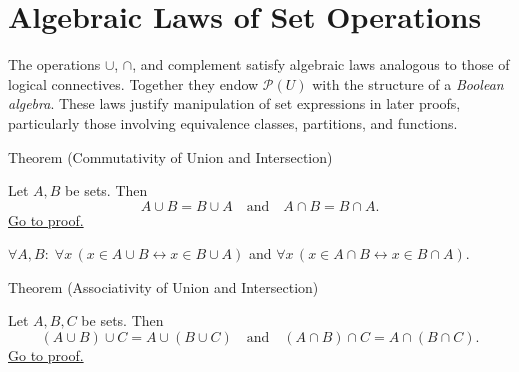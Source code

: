 
\section{Algebraic Laws of Set Operations}


\begin{remark*}
The operations $\cup$, $\cap$, and complement satisfy algebraic laws analogous
to those of logical connectives. Together they endow $\mathcal{P}(U)$ with
the structure of a \emph{Boolean algebra}. These laws justify manipulation
of set expressions in later proofs, particularly those involving equivalence
classes, partitions, and functions.
\end{remark*}

\begin{theorembox}{Theorem (Commutativity of Union and Intersection)}
\begin{theorem}\label{thm:commutativity}
Let $A,B$ be sets. Then
\[
A \cup B = B \cup A
\quad\text{and}\quad
A \cap B = B \cap A.
\]
\hyperref[prf:commutativity]{Go to proof.}
\end{theorem}
\end{theorembox}

\NoLocalDependencies

\begin{remark*}
$\forall A, B:\; \forall x\,(x \in A \cup B \leftrightarrow x \in B \cup A)$ and $\forall x\,(x \in A \cap B \leftrightarrow x \in B \cap A)$.
\end{remark*}

\begin{theorembox}{Theorem (Associativity of Union and Intersection)}
\begin{theorem}\label{thm:associativity}
Let $A,B,C$ be sets. Then
\[
(A \cup B) \cup C = A \cup (B \cup C)
\quad\text{and}\quad
(A \cap B) \cap C = A \cap (B \cap C).
\]
\hyperref[prf:associativity]{Go to proof.}
\end{theorem}
\end{theorembox}

